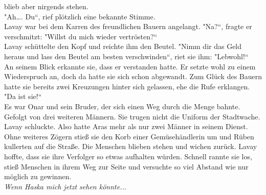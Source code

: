 blieb aber nirgends stehen.\\
"Ah…. Du``, rief plötzlich eine bekannte Stimme.\\
Lavay war bei dem Karren des freundlichen Bauern angelangt. "Na?``, fragte er verschmitzt: "Willst 
du mich wieder vertrösten?``\\
Lavay schüttelte den Kopf und reichte ihm den Beutel. "Nimm dir das Geld heraus und lass den Beutel 
am besten verschwinden``, riet sie ihm: "Lebwohl!``\\
An seinem Blick erkannte sie, dass er verstanden hatte. Er setzte wohl zu einem Wiederspruch an, 
doch da hatte sie sich schon abgewandt. Zum Glück des Bauern hatte sie bereits zwei Kreuzungen 
hinter sich gelassen, ehe die Rufe erklangen.\\
"Da ist sie!``\\
Es war Onar und sein Bruder, der sich einen Weg durch die Menge bahnte. Gefolgt von drei weiteren 
Männern. Sie trugen nicht die Uniform der Stadtwache. Lavay schluckte. Also hatte Aras mehr als nur 
zwei Männer in seinem Dienst. Ohne weiteres Zögern stieß sie den Korb einer Gemüsehändlerin um und 
Rüben kullerten auf die Straße. Die Menschen blieben stehen und wichen zurück. Lavay hoffte, dass 
sie ihre Verfolger so etwas aufhalten würden. Schnell rannte sie los, stieß Menschen in ihrem Weg 
zur Seite und versuchte so viel Abstand wie nur möglich zu gewinnen.\\
\textit{Wenn Haska mich jetzt sehen könnte...}\\